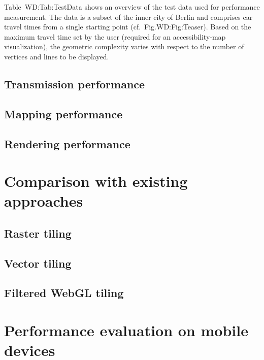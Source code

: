       Table~{WD:Tab:TestData} shows an overview of the test data used for performance
      measurement. The data is a subset of the inner city of Berlin and comprises car
      travel times from a single starting point (cf.~Fig.{WD:Fig:Teaser}). Based on
      the maximum travel time set by the user (required for an accessibility-map visualization),
      the geometric complexity varies with respect to the number of vertices and lines
      to be displayed.\par
    \subsection{Transmission performance}
      \label{sec:evalu:pcomp:trans}
    \subsection{Mapping performance}
      \label{sec:evalu:pcomp:mappg}
    \subsection{Rendering performance}
      \label{sec:evalu:pcomp:rendr}
  \section{Comparison with existing approaches}
    \label{sec:evalu:ecomp}
    \subsection{Raster tiling}
      \label{sec:evalu:ecomp:rastr}
    \subsection{Vector tiling}
      \label{sec:evalu:ecomp:vectr}
    \subsection{Filtered WebGL tiling}
      \label{sec:evalu:ecomp:webgl}
  \section{Performance evaluation on mobile devices}
    \label{sec:evalu:mobil}
